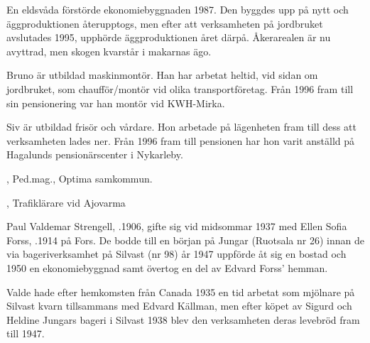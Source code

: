 En eldsvåda förstörde ekonomiebyggnaden 1987. Den byggdes upp på nytt och äggproduktionen återupptogs, men efter att verksamheten på jordbruket avslutades 1995, upphörde äggproduktionen året därpå. Åkerarealen är nu avyttrad, men skogen kvarstår i makarnas ägo.

Bruno är utbildad maskinmontör. Han har arbetat heltid, vid sidan om jordbruket, som chaufför/montör vid olika transportföretag. Från 1996 fram till sin pensionering var han montör vid KWH-Mirka.

Siv är utbildad frisör och vårdare. Hon arbetade på lägenheten fram till dess att verksamheten lades ner. Från 1996 fram till pensionen har hon varit anställd på Hagalunds pensionärscenter i Nykarleby.
\begin{jhchildren}
  \item {}, Ped.mag., Optima samkommun.
  \item {}, Trafiklärare vid Ajovarma
\end{jhchildren}


%
Paul Valdemar Strengell, .1906, gifte sig vid midsommar 1937 med Ellen Sofia Forss, .1914 på Fors. De bodde till en början på Jungar (Ruotsala nr 26) innan de via bageriverksamhet på Silvast (nr 98) år 1947 uppförde åt sig en bostad och 1950 en ekonomiebyggnad samt övertog en del av Edvard Forss' hemman.

Valde hade efter hemkomsten från Canada 1935 en tid arbetat som mjölnare på Silvast kvarn tillsammans med Edvard Källman, men efter köpet av Sigurd och Heldine Jungars bageri i Silvast 1938 blev den verksamheten deras levebröd fram till 1947.
\begin{jhchildren}
  \item {}
  \item {}
  \item {}
  \item {}
  \item {}
  \item {}
\end{jhchildren}

